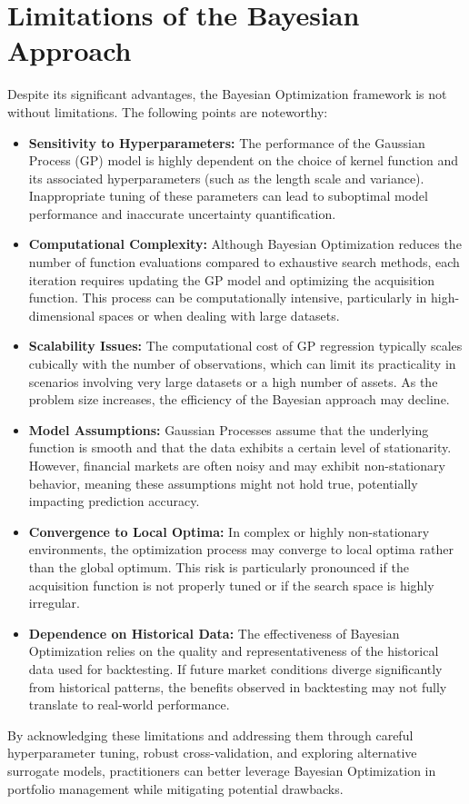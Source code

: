 \documentclass[a4paper,12pt]{article}
\begin{document}
\section{Limitations of the Bayesian Approach}
Despite its significant advantages, the Bayesian Optimization framework is not without limitations. The following points are noteworthy:
\begin{itemize}
    \item \textbf{Sensitivity to Hyperparameters:} The performance of the Gaussian Process (GP) model is highly dependent on the choice of kernel function and its associated hyperparameters (such as the length scale and variance). Inappropriate tuning of these parameters can lead to suboptimal model performance and inaccurate uncertainty quantification.
    \item \textbf{Computational Complexity:} Although Bayesian Optimization reduces the number of function evaluations compared to exhaustive search methods, each iteration requires updating the GP model and optimizing the acquisition function. This process can be computationally intensive, particularly in high-dimensional spaces or when dealing with large datasets.
    \item \textbf{Scalability Issues:} The computational cost of GP regression typically scales cubically with the number of observations, which can limit its practicality in scenarios involving very large datasets or a high number of assets. As the problem size increases, the efficiency of the Bayesian approach may decline.
    \item \textbf{Model Assumptions:} Gaussian Processes assume that the underlying function is smooth and that the data exhibits a certain level of stationarity. However, financial markets are often noisy and may exhibit non-stationary behavior, meaning these assumptions might not hold true, potentially impacting prediction accuracy.
    \item \textbf{Convergence to Local Optima:} In complex or highly non-stationary environments, the optimization process may converge to local optima rather than the global optimum. This risk is particularly pronounced if the acquisition function is not properly tuned or if the search space is highly irregular.
    \item \textbf{Dependence on Historical Data:} The effectiveness of Bayesian Optimization relies on the quality and representativeness of the historical data used for backtesting. If future market conditions diverge significantly from historical patterns, the benefits observed in backtesting may not fully translate to real-world performance.
\end{itemize}
By acknowledging these limitations and addressing them through careful hyperparameter tuning, robust cross-validation, and exploring alternative surrogate models, practitioners can better leverage Bayesian Optimization in portfolio management while mitigating potential drawbacks.
\end{document}
